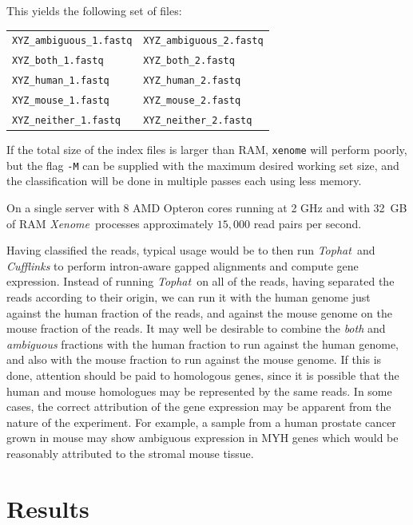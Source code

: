 \documentclass{bioinfo}
\newcommand{\Xenome}{\textit{Xenome}{}}
\newcommand{\Tophat}{\textit{Tophat}{}}
\begin{document}
This yields the following set of files:

\begin{tabular}{ll}
\texttt{XYZ\_ambiguous\_1.fastq} &
\texttt{XYZ\_ambiguous\_2.fastq} \\
\texttt{XYZ\_both\_1.fastq} &
\texttt{XYZ\_both\_2.fastq} \\
\texttt{XYZ\_human\_1.fastq} &
\texttt{XYZ\_human\_2.fastq} \\
\texttt{XYZ\_mouse\_1.fastq} &
\texttt{XYZ\_mouse\_2.fastq} \\
\texttt{XYZ\_neither\_1.fastq} &
\texttt{XYZ\_neither\_2.fastq} \\
\end{tabular}

If the total size of the index files is larger than RAM, \texttt{xenome}
will perform poorly, but the flag \texttt{-M} can be supplied with the
maximum desired working set size, and the classification will be done in
multiple passes each using less memory.

On a single server with 8 AMD Opteron  cores running at 2 GHz and 
with 32~GB of RAM  \Xenome\  processes approximately $15,000$ read pairs per second.

Having classified the reads, typical usage would be to then run \Tophat\
and \textit{Cufflinks} to perform intron-aware gapped alignments and
compute gene expression. Instead of running \Tophat\ on all of the reads,
having separated the reads according to their origin, we can run it with
the human genome just against the human fraction of the reads, and against
the mouse genome on the mouse fraction of the reads.
It may well be desirable to combine the \textit{both} and \textit{ambiguous}
fractions with the human fraction to run against the human genome, and
also with the mouse fraction to run against the mouse genome. If this is done,
attention should be paid to homologous genes, since it is possible that
the human and mouse homologues may be represented by the same reads.
In some cases, the correct attribution of the gene expression may be apparent
from the nature of the experiment. For example, a sample from a human
prostate cancer grown in mouse may show ambiguous expression
in MYH genes which would be reasonably attributed to the stromal mouse tissue.

\section{Results}
\label{sec:results}
\end{document}

